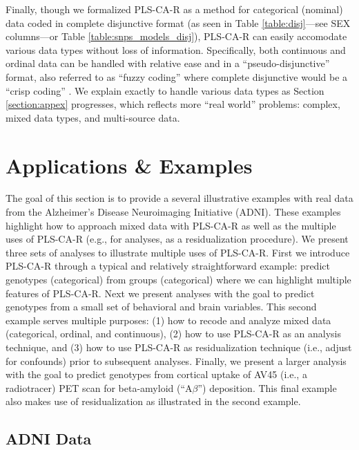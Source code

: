 \documentclass[12pt]{article}
\begin{document}
Finally, though we formalized PLS-CA-R as a method for categorical
(nominal) data coded in complete disjunctive format (as seen in Table
\ref{table:disj}---see SEX columns---or Table
\ref{table:snps_models_disj}), PLS-CA-R can easily accomodate various
data types without loss of information. Specifically, both continuous
and ordinal data can be handled with relative ease and in a
``pseudo-disjunctive'' format, also referred to as ``fuzzy coding''
where complete disjunctive would be a ``crisp coding''
\citep{greenacrefuzzy}. We explain exactly to handle various data types
as Section \ref{section:appex} progresses, which reflects more ``real
world'' problems: complex, mixed data types, and multi-source data.

\hypertarget{applications-examples}{%
\section{Applications \& Examples}\label{applications-examples}}

\label{section:appex}

The goal of this section is to provide a several illustrative examples
with real data from the Alzheimer's Disease Neuroimaging Initiative
(ADNI). These examples highlight how to approach mixed data with
PLS-CA-R as well as the multiple uses of PLS-CA-R (e.g., for analyses,
as a residualization procedure). We present three sets of analyses to
illustrate multiple uses of PLS-CA-R. First we introduce PLS-CA-R
through a typical and relatively straightforward example: predict
genotypes (categorical) from groups (categorical) where we can highlight
multiple features of PLS-CA-R. Next we present analyses with the goal to
predict genotypes from a small set of behavioral and brain variables.
This second example serves multiple purposes: (1) how to recode and
analyze mixed data (categorical, ordinal, and continuous), (2) how to
use PLS-CA-R as an analysis technique, and (3) how to use PLS-CA-R as
residualization technique (i.e., adjust for confounds) prior to
subsequent analyses. Finally, we present a larger analysis with the goal
to predict genotypes from cortical uptake of AV45 (i.e., a radiotracer)
PET scan for beta-amyloid (``A\(\beta\)'') deposition. This final
example also makes use of residualization as illustrated in the second
example.

\hypertarget{adni-data}{%
\subsection{ADNI Data}\label{adni-data}}
\end{document}
